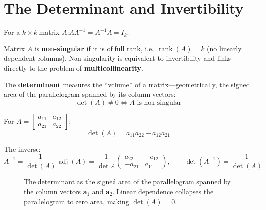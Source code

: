 \section{The Determinant and Invertibility}
\label{sec_Determinant}

For a $k \times k$ matrix $A$:\quad $AA^{-1} = A^{-1}A = I_k$.

Matrix $A$ is \textbf{non-singular} if it is of
full rank, i.e.\ $\operatorname{rank}(A) = k$ (no linearly dependent columns).
Non-singularity is equivalent to invertibility and links directly to the
problem of \textbf{multicollinearity}.

The \textbf{determinant} measures the ``volume'' of
a matrix---geometrically, the signed area of the parallelogram spanned by its
column vectors:
\begin{equation}
  \det(A) \neq 0 \iff A \text{ is non-singular}
\end{equation}

For $A = \begin{bmatrix} a_{11} & a_{12} \\ a_{21} & a_{22} \end{bmatrix}$:
\begin{equation}
  \det(A) = a_{11}a_{22} - a_{12}a_{21}
\end{equation}

The inverse:
\begin{equation}
  A^{-1} = \frac{1}{\det(A)}\operatorname{adj}(A)
  = \frac{1}{\det A}
    \begin{pmatrix} a_{22} & -a_{12} \\ -a_{21} & a_{11} \end{pmatrix},
  \qquad \det(A^{-1}) = \frac{1}{\det(A)}
\end{equation}

\begin{figure}[htp]
\centering
{}
\caption{The determinant as the signed area of the parallelogram spanned
by the column vectors $\mathbf{a}_1$ and $\mathbf{a}_2$. Linear dependence
collapses the parallelogram to zero area, making $\det(A) = 0$.}
\label{fig_Determinant}
\end{figure}


